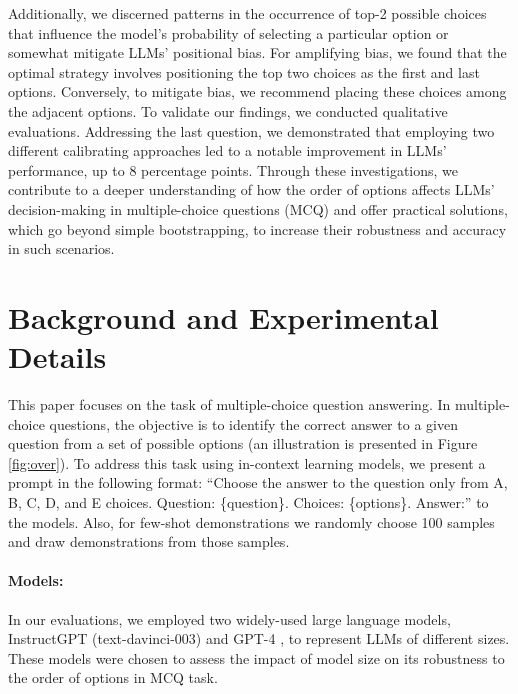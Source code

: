 \documentclass[11pt]{article}
\newcommand*{\promptfont}{\fontfamily{courier}\selectfont}
\begin{document}
Additionally, we discerned patterns in the occurrence of top-2 possible choices that influence the model's probability of selecting a particular option or somewhat mitigate LLMs' positional bias. For amplifying bias, we found that the optimal strategy involves positioning the top two choices as the first and last options. Conversely, to mitigate bias, we recommend placing these choices among the adjacent options. 
To validate our findings, we conducted qualitative evaluations. 
Addressing the last question, we demonstrated that employing two different calibrating approaches led to a notable improvement in LLMs' performance, up to $8$ percentage points.  
Through these investigations, we contribute to a deeper understanding of how the order of options affects LLMs' decision-making in multiple-choice questions (MCQ) and offer practical solutions, which go beyond simple bootstrapping, to increase their robustness and accuracy in such scenarios.




\section{Background and Experimental Details}
This paper focuses on the task of multiple-choice question answering. In multiple-choice questions, the objective is to identify the correct answer to a given question from a set of possible options (an illustration is presented in Figure \ref{fig:over}). To address this task using in-context learning models, we present a prompt in the following format: {\promptfont ``Choose the answer to the question only from A, B, C, D, and E choices. Question: \{question\}. Choices: \{options\}. Answer:''} to the models. 
Also, for few-shot demonstrations we randomly choose 100 samples and draw demonstrations from those samples.

\paragraph{Models:} 
In our evaluations, we employed two widely-used large language models, InstructGPT (text-davinci-003) \citep{ouyang2022training} and GPT-4 \citep{openai2023gpt-4}, to represent LLMs of different sizes. 
These models were chosen to assess the impact of model size on its robustness to the order of options in MCQ task.
\end{document}
